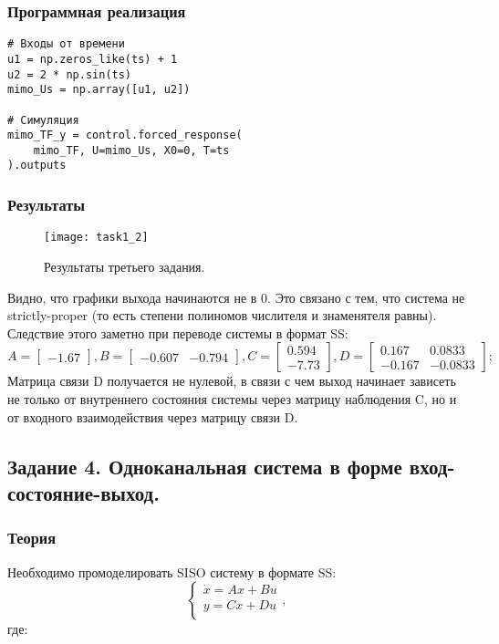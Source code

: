 \documentclass[16pt]{article}
\begin{document}
\subsubsection{Программная реализация}
\begin{verbatim}
# Входы от времени
u1 = np.zeros_like(ts) + 1
u2 = 2 * np.sin(ts)
mimo_Us = np.array([u1, u2])

# Симуляция
mimo_TF_y = control.forced_response(
    mimo_TF, U=mimo_Us, X0=0, T=ts
).outputs
\end{verbatim}

\subsubsection{Результаты}
\begin{figure}[H]
	\centering
	\texttt{[image: task1\_2]}
	\caption{Результаты третьего задания.}
	\label{fig:fig3}
\end{figure}
Видно, что графики выхода начинаются не в 0. Это связано с тем, что система не strictly-proper (то есть степени полиномов числителя и знаменятеля равны). Следствие этого заметно при переводе системы в формат SS: 
\[ A = \begin{bmatrix}
    -1.67
    \end{bmatrix},
    B = \begin{bmatrix}
        -0.607 & -0.794
        \end{bmatrix},
    C = \begin{bmatrix}
        0.594 \\
        -7.73
        \end{bmatrix},
    D = \begin{bmatrix}
        0.167 & 0.0833 \\
        -0.167 & -0.0833
        \end{bmatrix};
\]
Матрица связи D получается не нулевой, в связи с чем выход начинает зависеть не только от внутреннего состояния системы через матрицу наблюдения C, но и от входного взаимодействия через матрицу связи D.

\newpage
\subsection{Задание 4. Одноканальная система в форме вход-состояние-выход.}
\subsubsection{Теория}
Необходимо промоделировать SISO систему в формате SS:
\[ 
    \begin{cases}
        \dot{x} = Ax + Bu \\
        y = Cx + Du \\
    \end{cases},
\]
где:
\end{document}
